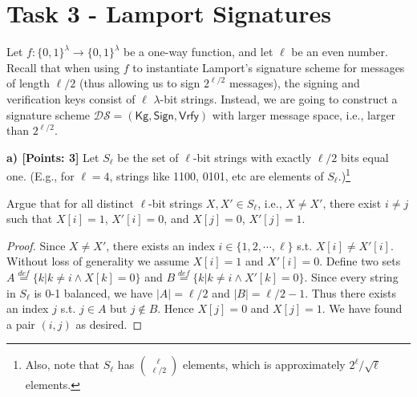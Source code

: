 \documentclass[12pt]{article}
\newcommand{\eqdef}{\stackrel{def}{=}}
\newcommand{\bits}{\{0,1\}}
\newcommand{\Vrfy}{\textsf{Vrfy}}
\theoremstyle{definition}
\newcommand{\Kg}{\textsf{Kg}}
\begin{document}
\newcommand{\DS}{\mathcal{DS}}
\newcommand{\Sign}{\textsf{Sign}}
\section{Task 3 - Lamport Signatures}
Let $f : \bits^\lambda \to \bits^\lambda$ be a one-way function, and let $\ell$ be an even number. Recall that when using $f$ to instantiate Lamport's signature scheme for messages of length $\ell/2$ (thus allowing us to sign $2^{\ell/2}$ messages), the signing and verification keys consist of $\ell$ $\lambda$-bit strings. Instead, we are going to construct a signature scheme $\DS = (\Kg, \Sign, \Vrfy)$ with larger message space, i.e., larger than $2^{\ell/2}$.

{\bf a) [Points: 3]} Let $S_{\ell}$ be the set of $\ell$-bit strings with exactly $\ell/2$ bits equal one. (E.g., for $\ell = 4$, strings like 1100, 0101, etc are elements of $S_{\ell}.$)\footnote{Also, note that $S_{\ell}$ has $\binom{\ell}{\ell/2}$ elements, which is approximately $2^{\ell}/\sqrt{\ell}$ elements.}

Argue that for all distinct $\ell$-bit strings $X, X' \in S_{\ell}$, i.e., $X \not= X'$, there exist $i \not= j$ such that $X[i]=1$, $X'[i]=0$, and $X[j]=0$, $X'[j]=1$.
\begin{proof}
Since $X \not= X'$, there exists an index $i \in \{1, 2, \cdots, \ell\}$ s.t. $X[i] \not= X'[i]$. Without loss of generality we assume $X[i]=1$ and $X'[i]=0$. Define two sets $A \eqdef \{k | k\not=i \wedge X[k] = 0\}$ and $B \eqdef \{k | k\not=i \wedge X'[k] = 0\}$. Since every string in $S_{\ell}$ is 0-1 balanced, we have $|A| = \ell/2$ and $|B| = \ell/2 -1$. Thus there exists an index $j$ s.t. $j \in A$ but $j \not\in B$. Hence $X[j]=0$ and $X[j]=1$. We have found a pair $(i,j)$ as desired.
\end{proof}
\end{document}
